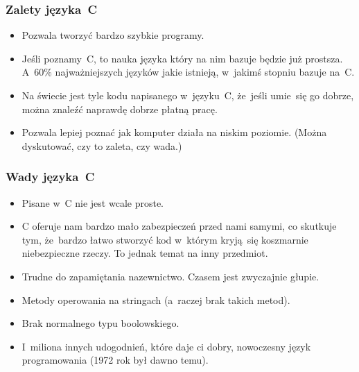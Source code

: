 \documentclass[10pt,t]{beamer}
\begin{document}
\begin{frame}
  \frametitle{Zalety języka~C}


  \begin{itemize}

  \item Pozwala tworzyć bardzo szybkie programy.

  \item Jeśli poznamy~C, to nauka języka który na nim bazuje będzie
    już prostsza. A~60\% najważniejszych języków jakie istnieją, w~jakimś
    stopniu bazuje na~C.

  \item Na świecie jest tyle kodu napisanego w~języku~C, że~jeśli umie~się
    go dobrze, można znaleźć naprawdę dobrze płatną pracę.

  \item Pozwala lepiej poznać jak komputer działa na niskim poziomie.
    (Można dyskutować, czy to zaleta, czy wada.)

  \end{itemize}

\end{frame}





\begin{frame}
  \frametitle{Wady języka~C}


  \begin{itemize}

  \item Pisane w~C nie jest wcale proste.

  \item C oferuje nam bardzo mało zabezpieczeń przed nami samymi, co
    skutkuje tym, że~bardzo łatwo stworzyć kod w~którym kryją~się
    koszmarnie niebezpieczne rzeczy. To jednak temat na inny przedmiot.

  \item Trudne do zapamiętania nazewnictwo. Czasem jest zwyczajnie głupie.

  \item Metody operowania na stringach (a~raczej brak takich metod).

  \item Brak normalnego typu boolowskiego.

  \item I~miliona innych udogodnień, które daje ci dobry, nowoczesny język
    programowania (1972 rok był dawno temu).

  \end{itemize}

\end{frame}
\end{document}

